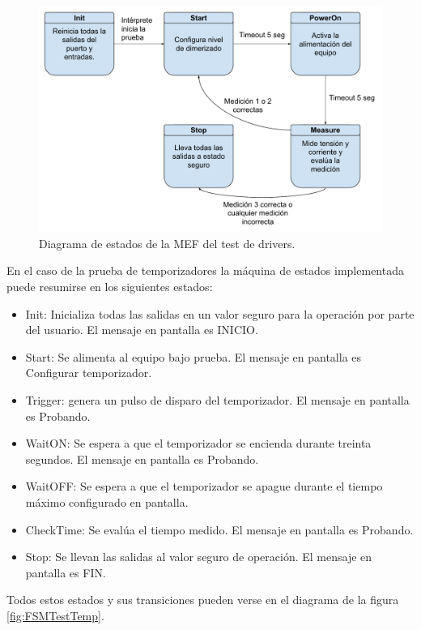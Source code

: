 \begin{figure}[H]
	\centering
	\includegraphics[width=1\textwidth]{./Figures/FSMTestDrivers.pdf}
	\caption{Diagrama de estados de la MEF del test de drivers.}
	\label{fig:FSMTestDrivers}
\end{figure}


En el caso de la prueba de temporizadores la máquina de estados implementada puede resumirse en los siguientes estados:
\begin{itemize}
	\item Init: Inicializa todas las salidas en un valor seguro para la operación por parte del usuario. El mensaje en pantalla es INICIO.
	\item Start: Se alimenta al equipo bajo prueba. El mensaje en pantalla es Configurar temporizador.
	\item Trigger: genera un pulso de disparo del temporizador. El mensaje en pantalla es Probando.
	\item WaitON: Se espera a que el temporizador se encienda durante treinta segundos. El mensaje en pantalla es Probando.
	\item WaitOFF: Se espera a que el temporizador se apague durante el tiempo máximo configurado en pantalla.
	\item CheckTime: Se evalúa el tiempo medido. El mensaje en pantalla es Probando.
	\item Stop: Se llevan las salidas al valor seguro de operación. El mensaje en pantalla es FIN.
\end{itemize}

Todos estos estados y sus transiciones pueden verse en el diagrama de la figura \ref{fig:FSMTestTemp}.

